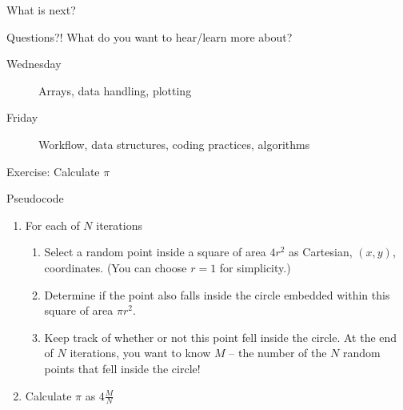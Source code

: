 \documentclass{beamer}
\begin{document}

\begin{frame}{What is next?}
  \begin{block}{Questions?!}
    What do you want to hear/learn more about?
  \end{block}
  \begin{description}
    \item[Wednesday] Arrays, data handling, plotting
    \item[Friday] Workflow, data structures, coding practices, algorithms
  \end{description}
\end{frame}

\begin{frame}[fragile]{Exercise: Calculate $\pi$}
	\begin{block}{Pseudocode}
		\begin{enumerate}
			\item For each of $N$ iterations
			\begin{enumerate}
				\item Select a random point inside a square of area $4r^2$ as Cartesian, $(x, y)$, coordinates. (You can choose $r=1$ for simplicity.)
				\item Determine if the point also falls inside the circle embedded within this square of area $\pi r^2$.
				\item Keep track of whether or not this point fell inside the circle. At the end of $N$ iterations, you want to know $M$ -- the number of the $N$ random points that fell inside the circle!
			\end{enumerate}
		\item Calculate $\pi$ as $4\frac{M}{N}$
		\end{enumerate}
	\end{block}
\end{frame}
\end{document}

